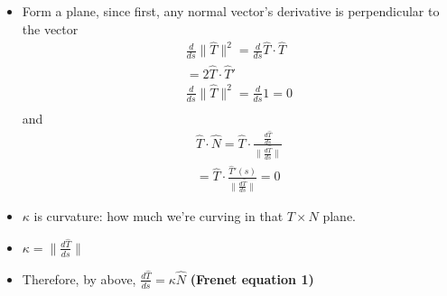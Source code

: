 \documentclass[11pt, oneside]{article}   	%
\begin{document}
\begin{itemize}
\item Form a plane, since first, any normal vector's derivative is perpendicular to the vector
\begin{align}
\frac{d}{ds} \|\hat{T}\|^2 = \frac{d}{ds} \hat{T} \cdot \hat{T} \\
= 2\hat{T} \cdot \hat{T}' \\
\frac{d}{ds} \|\hat{T}\|^2 = \frac{d}{ds} 1 = 0 \\
\end{align}
and 
\begin{align}
\hat{T} \cdot \hat{N} =   \hat{T} \cdot \frac { \frac{d\hat{T}}{ds} }   {\|  \frac{d\hat{T}}{ds}  \|} \\ 
=  \hat{T} \cdot \frac { \hat{T}'(s)}  {\|  \frac{d\hat{T}}{ds}  \|} = 0 
\end{align}
\item $\kappa$ is curvature: how much we're curving in that $T \times N$ plane.
\item $\kappa =   \|  \frac{d\hat{T}}{ds}  \| $ 
\item Therefore, by above, $\frac{d\hat{T}}{ds} = \kappa \hat{N}$ \textbf{(Frenet equation 1)}

\end{itemize}
\end{document}
